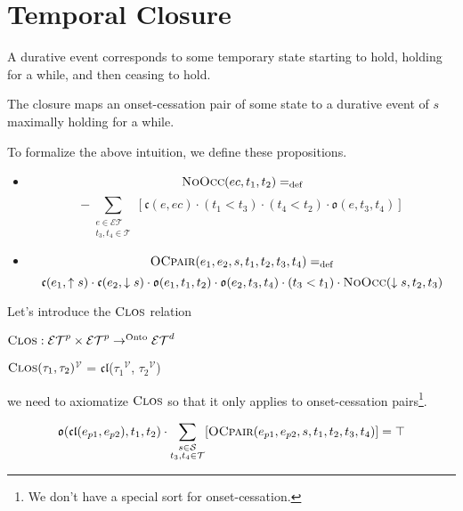 \section{Temporal Closure}
A durative event corresponds to some temporary state starting to hold, holding for a while, and
then ceasing to hold.

The closure maps an onset-cessation pair of some state to a durative event of $s$ maximally holding for a while.

To formalize the above intuition, we define these propositions.
\begin{itemize}
	\item \[\textsc{NoOcc}(ec, t_1, t_2) =_{\text{def}}\]
	      \[ -\sum_{\substack{{e \in \mathcal{ET}} \\ t_3, t_4 \in \mathcal{T}}}
		      [\mathfrak{c}(e, ec) \cdot (t_1 < t_3) \cdot (t_4 < t_2) \cdot \mathfrak{o}(e, t_3, t_4)]\]
	\item \[
		      \textsc{OCpair}(e_1, e_2, s, t_1, t_2, t_3, t_4) =_{\text{def}}
	      \]
	      \[
		      \mathfrak{c}(e_1, \uparrow s) \cdot \mathfrak{c}(e_2, \downarrow s) \cdot \mathfrak{o}(e_1, t_1, t_2) \cdot \mathfrak{o}(e_2, t_3, t_4) \cdot (t_3 < t_1) \cdot \textsc{NoOcc}(\downarrow s, t_2, t_3)
	      \]
\end{itemize}

Let's introduce the $\textsc{Clos}$ relation

\begin{defn}
	$\textsc{Clos} : \mathcal{ET}^p \times \mathcal{ET}^p \to^{\text{Onto}} \mathcal{ET}^d$
\end{defn}

\begin{defn}
	\textlbrackdbl $\textsc{Clos}(\tau_1, \tau_2)$\textrbrackdbl$^{\mathcal{V}}$ = $\mathfrak{cl}$(\textlbrackdbl $\tau_1$\textrbrackdbl$^{\mathcal{V}}$, \textlbrackdbl $\tau_2$\textrbrackdbl$^{\mathcal{V}}$)
\end{defn}

we need to axiomatize  $\textsc{Clos}$  so that it only applies to onset-cessation pairs\footnote{We don't have a special sort for onset-cessation.}.

\begin{axiom}\label{ax:onset_cessation_pair}
	\begin{equation}
		\mathfrak{o}(\mathfrak{cl}(e_{p1}, e_{p2}), t_1, t_2) \cdot \sum_{\substack{s \in \mathcal{S} \\ t_3, t_4 \in \mathcal{T}}}[ \textsc{OCpair}(e_{p1}, e_{p2}, s, t_1, t_2, t_3, t_4) ] = \top
	\end{equation}
\end{axiom}

